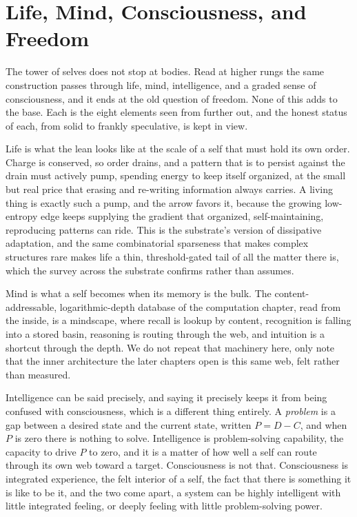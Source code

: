 \section{Life, Mind, Consciousness, and Freedom}

The tower of selves does not stop at bodies. Read at higher rungs the same construction passes through life, mind, intelligence, and a graded sense of consciousness, and it ends at the old question of freedom. None of this adds to the base. Each is the eight elements seen from further out, and the honest status of each, from solid to frankly speculative, is kept in view.

Life is what the lean looks like at the scale of a self that must hold its own order. Charge is conserved, so order drains, and a pattern that is to persist against the drain must actively pump, spending energy to keep itself organized, at the small but real price that erasing and re-writing information always carries. A living thing is exactly such a pump, and the arrow favors it, because the growing low-entropy edge keeps supplying the gradient that organized, self-maintaining, reproducing patterns can ride. This is the substrate's version of dissipative adaptation, and the same combinatorial sparseness that makes complex structures rare makes life a thin, threshold-gated tail of all the matter there is, which the survey across the substrate confirms rather than assumes.

Mind is what a self becomes when its memory is the bulk. The content-addressable, logarithmic-depth database of the computation chapter, read from the inside, is a mindscape, where recall is lookup by content, recognition is falling into a stored basin, reasoning is routing through the web, and intuition is a shortcut through the depth. We do not repeat that machinery here, only note that the inner architecture the later chapters open is this same web, felt rather than measured.

Intelligence can be said precisely, and saying it precisely keeps it from being confused with consciousness, which is a different thing entirely. A \emph{problem} is a gap between a desired state and the current state, written $P = D - C$, and when $P$ is zero there is nothing to solve. Intelligence is problem-solving capability, the capacity to drive $P$ to zero, and it is a matter of how well a self can route through its own web toward a target. Consciousness is not that. Consciousness is integrated experience, the felt interior of a self, the fact that there is something it is like to be it, and the two come apart, a system can be highly intelligent with little integrated feeling, or deeply feeling with little problem-solving power.

